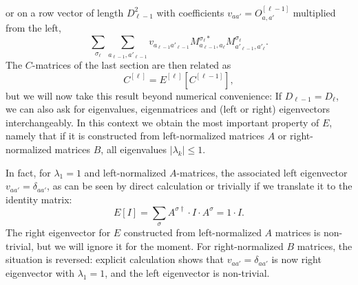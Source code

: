 or on a row vector of length $D_{\ell-1}^2$ with coefficients $v_{aa'} = O^{[\ell-1]}_{a,a'}$ multiplied from the left,
\begin{equation}
\sum_{\sigma_\ell} \sum_{a_{\ell-1},a'_{\ell-1}} v_{a_{\ell-1}a'_{\ell-1}} M^{\sigma_\ell*}_{a_{\ell-1},a_\ell} M^{\sigma_\ell}_{a'_{\ell-1},a'_\ell} .
\end{equation} 
The $C$-matrices of the last section are then related as
\begin{equation}
C^{[\ell]} = E^{[\ell]} [C^{[\ell-1]}]  ,
\end{equation}
but we will now take this result beyond numerical convenience: If $D_{\ell-1}=D_\ell$, we can also ask for eigenvalues, eigenmatrices and (left or right) eigenvectors interchangeably. In this context we obtain the most important property of $E$, namely that if it is constructed from left-normalized matrices $A$ or right-normalized matrices $B$, all eigenvalues $|\lambda_k| \leq 1$. 

In fact, for $\lambda_1=1$ and left-normalized $A$-matrices, the associated left eigenvector $v_{aa'}=\delta_{aa'}$, as can be seen by direct calculation or trivially if we translate it to the identity matrix:
\begin{equation}
E[I] = \sum_\sigma A^{\sigma\dagger} \cdot I \cdot A^{\sigma} = 1 \cdot I .
\end{equation}
The right eigenvector for $E$ constructed from left-normalized $A$ matrices is non-trivial, but we will ignore it for the moment. For right-normalized $B$ matrices, the situation is reversed: explicit calculation shows that $v_{aa'}=\delta_{aa'}$ is now right eigenvector with $\lambda_1=1$, and the left eigenvector is non-trivial. 

